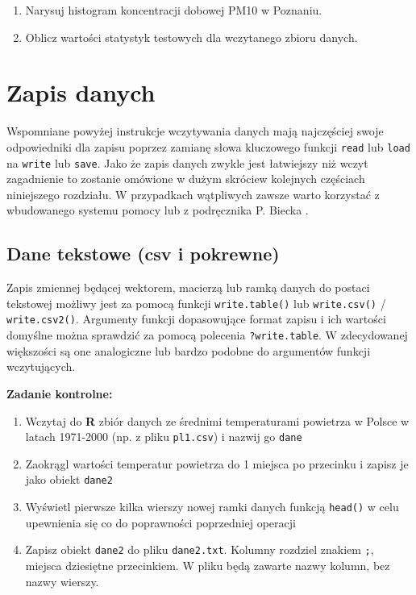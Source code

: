 \documentclass[]{book}
\providecommand{\tightlist}{%
  \setlength{\itemsep}{0pt}\setlength{\parskip}{0pt}}
\theoremstyle{definition}
\theoremstyle{definition}
\theoremstyle{definition}
\theoremstyle{remark}
\begin{document}
\begin{enumerate}
\def\labelenumi{\arabic{enumi}.}
\tightlist
\item
  Narysuj histogram koncentracji dobowej PM10 w Poznaniu.
\item
  Oblicz wartości statystyk testowych dla wczytanego zbioru danych.
\end{enumerate}

\section{Zapis danych}\label{zapis-danych}

Wspomniane powyżej instrukcje wczytywania danych mają najczęściej swoje
odpowiedniki dla zapisu poprzez zamianę słowa kluczowego funkcji
\texttt{read} lub \texttt{load} na \texttt{write} lub \texttt{save}.
Jako że zapis danych zwykle jest łatwiejszy niż wczyt zagadnienie to
zostanie omówione w dużym skróciew kolejnych częściach niniejszego
rozdziału. W przypadkach wątpliwych zawsze warto korzystać z wbudowanego
systemu pomocy lub z podręcznika P. Biecka \citep{biecek2016}.

\subsection{Dane tekstowe (csv i
pokrewne)}\label{dane-tekstowe-csv-i-pokrewne}

Zapis zmiennej będącej wektorem, macierzą lub ramką danych do postaci
tekstowej możliwy jest za pomocą funkcji \texttt{write.table()} lub
\texttt{write.csv()} / \texttt{write.csv2()}. Argumenty funkcji
dopasowujące format zapisu i ich wartości domyślne można sprawdzić za
pomocą polecenia \texttt{?write.table}. W zdecydowanej większości są one
analogiczne lub bardzo podobne do argumentów funkcji wczytujących.

\textbf{Zadanie kontrolne:}

\begin{enumerate}
\def\labelenumi{\arabic{enumi}.}
\tightlist
\item
  Wczytaj do \textbf{R} zbiór danych ze średnimi temperaturami powietrza
  w Polsce w latach 1971-2000 (np. z pliku \texttt{pl1.csv}) i nazwij go
  \texttt{dane}
\item
  Zaokrągl wartości temperatur powietrza do 1 miejsca po przecinku i
  zapisz je jako obiekt \texttt{dane2}
\item
  Wyświetl pierwsze kilka wierszy nowej ramki danych funkcją
  \texttt{head()} w celu upewnienia się co do poprawności poprzedniej
  operacji
\item
  Zapisz obiekt \texttt{dane2} do pliku \texttt{dane2.txt}. Kolumny
  rozdziel znakiem \texttt{;}, miejsca dziesiętne przecinkiem. W pliku
  będą zawarte nazwy kolumn, bez nazwy wierszy.
\end{enumerate}
\end{document}

